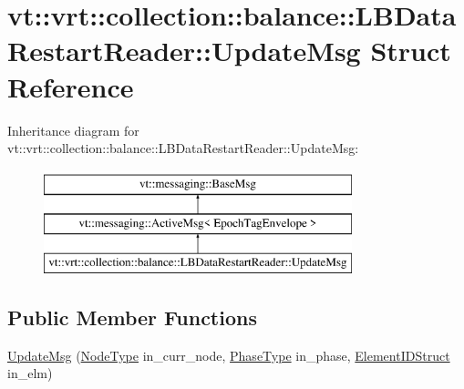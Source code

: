 \hypertarget{structvt_1_1vrt_1_1collection_1_1balance_1_1_l_b_data_restart_reader_1_1_update_msg}{}\section{vt\+:\+:vrt\+:\+:collection\+:\+:balance\+:\+:L\+B\+Data\+Restart\+Reader\+:\+:Update\+Msg Struct Reference}
\label{structvt_1_1vrt_1_1collection_1_1balance_1_1_l_b_data_restart_reader_1_1_update_msg}
Inheritance diagram for vt\+:\+:vrt\+:\+:collection\+:\+:balance\+:\+:L\+B\+Data\+Restart\+Reader\+:\+:Update\+Msg\+:\begin{figure}[H]
\begin{center}
\leavevmode
\includegraphics[height=3.000000cm]{structvt_1_1vrt_1_1collection_1_1balance_1_1_l_b_data_restart_reader_1_1_update_msg}
\end{center}
\end{figure}
\subsection*{Public Member Functions}
\begin{DoxyCompactItemize}
\item 
\hyperlink{structvt_1_1vrt_1_1collection_1_1balance_1_1_l_b_data_restart_reader_1_1_update_msg_a464255a6854dd3ed4053bffc35182ea0}{Update\+Msg} (\hyperlink{namespacevt_a866da9d0efc19c0a1ce79e9e492f47e2}{Node\+Type} in\+\_\+curr\+\_\+node, \hyperlink{namespacevt_a46ce6733d5cdbd735d561b7b4029f6d7}{Phase\+Type} in\+\_\+phase, \hyperlink{namespacevt_1_1vrt_1_1collection_1_1balance_a9f5b53fafb270212279a4757d2c4cd28}{Element\+I\+D\+Struct} in\+\_\+elm)
\end{DoxyCompactItemize}
